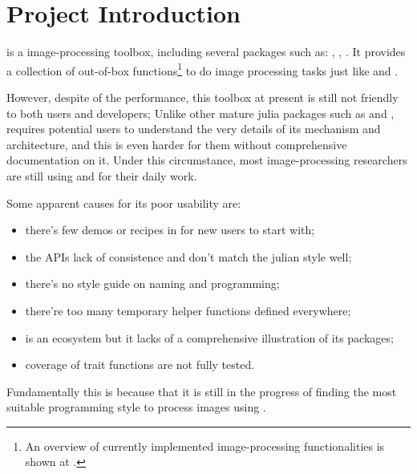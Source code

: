
\section{Project Introduction}\label{sec:project}

\repoimages{} is a \langjulia image-processing toolbox, including several packages such as: \imagecore, \imagetransformations, \imageaxes. It provides a collection of out-of-box functions\footnote{An overview of currently implemented image-processing functionalities is shown at \apicomparison.} to do image processing tasks just like \reposcikitimage and \matlabimageprocessing.

However, despite of the performance, this toolbox at present is still not friendly to both users and developers; Unlike other mature julia packages such as \repojump and \repogpuarrays, \images{} requires potential users to understand the very details of its mechanism and architecture, and this is even harder for them without comprehensive documentation on it. Under this circumstance, most image-processing researchers are still using \langpython and \langmatlab for their daily work.

Some apparent causes for its poor usability are:
\begin{itemize}
    \item there's few demos or recipes in \images{} for new users to start with;
    \item the APIs lack of consistence and don't match the julian style well;
    \item there's no style guide on naming and programming;
    \item there're too many temporary helper functions defined everywhere;
    \item \images{} is an ecosystem but it lacks of a comprehensive illustration of its packages;
    \item coverage of trait functions are not fully tested.
\end{itemize}
Fundamentally this is because that it is still in the progress of finding the most suitable programming style to process images using \langjulia.

